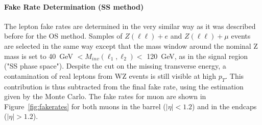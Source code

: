 \paragraph{Fake Rate Determination (SS method)}
\label{sec:fakerate}

The lepton fake rates are determined in the very similar way as it was described before for the OS method. Samples of $Z(\ell\ell)+e$ and $Z(\ell\ell)+\mu$ events are selected in the same way except that the mass window around the nominal Z mass is set to 40~GeV $< M_{inv}(\ell_{1},\ell_{2}) < $ 120~GeV, as in the signal region ("SS phase space").
Despite the cut on the missing transverse energy, a contamination of real leptons from WZ events is still visible at high $p_T$. This contribution is thus subtracted from the final fake rate, using the estimation given by the Monte Carlo. The fake rates for muon are shown in Figure~\ref{fig:fakerates} for both muons in the barrel ($|\eta|<1.2$) and in the endcaps ($|\eta|>1.2$).

